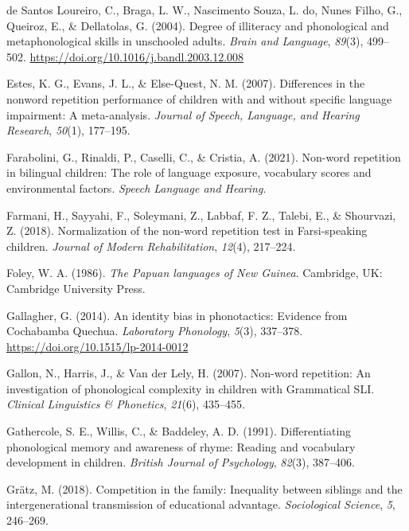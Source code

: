 \documentclass[english,,man,floatsintext]{apa6}
\begin{document}
\leavevmode\hypertarget{ref-de2004degree}{}%
de Santos Loureiro, C., Braga, L. W., Nascimento Souza, L. do, Nunes Filho, G., Queiroz, E., \& Dellatolas, G. (2004). Degree of illiteracy and phonological and metaphonological skills in unschooled adults. \emph{Brain and Language}, \emph{89}(3), 499--502. \url{https://doi.org/10.1016/j.bandl.2003.12.008}

\leavevmode\hypertarget{ref-estes2007differences}{}%
Estes, K. G., Evans, J. L., \& Else-Quest, N. M. (2007). Differences in the nonword repetition performance of children with and without specific language impairment: A meta-analysis. \emph{Journal of Speech, Language, and Hearing Research}, \emph{50}(1), 177--195.

\leavevmode\hypertarget{ref-farabolini2021nonword}{}%
Farabolini, G., Rinaldi, P., Caselli, C., \& Cristia, A. (2021). Non-word repetition in bilingual children: The role of language exposure, vocabulary scores and environmental factors. \emph{Speech Language and Hearing}.

\leavevmode\hypertarget{ref-farmani2018normalization}{}%
Farmani, H., Sayyahi, F., Soleymani, Z., Labbaf, F. Z., Talebi, E., \& Shourvazi, Z. (2018). Normalization of the non-word repetition test in Farsi-speaking children. \emph{Journal of Modern Rehabilitation}, \emph{12}(4), 217--224.

\leavevmode\hypertarget{ref-foley1986papuan}{}%
Foley, W. A. (1986). \emph{The Papuan languages of New Guinea}. Cambridge, UK: Cambridge University Press.

\leavevmode\hypertarget{ref-gallagher2014identity}{}%
Gallagher, G. (2014). An identity bias in phonotactics: Evidence from Cochabamba Quechua. \emph{Laboratory Phonology}, \emph{5}(3), 337--378. \url{https://doi.org/10.1515/lp-2014-0012}

\leavevmode\hypertarget{ref-gallon2007non}{}%
Gallon, N., Harris, J., \& Van der Lely, H. (2007). Non-word repetition: An investigation of phonological complexity in children with Grammatical SLI. \emph{Clinical Linguistics \& Phonetics}, \emph{21}(6), 435--455.

\leavevmode\hypertarget{ref-gathercole1991differentiating}{}%
Gathercole, S. E., Willis, C., \& Baddeley, A. D. (1991). Differentiating phonological memory and awareness of rhyme: Reading and vocabulary development in children. \emph{British Journal of Psychology}, \emph{82}(3), 387--406.

\leavevmode\hypertarget{ref-gratz2018competition}{}%
Grätz, M. (2018). Competition in the family: Inequality between siblings and the intergenerational transmission of educational advantage. \emph{Sociological Science}, \emph{5}, 246--269.
\end{document}
